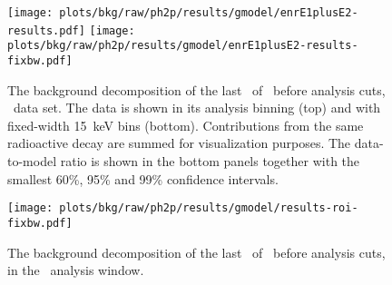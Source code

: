 \begin{figure}
  \centering
  \texttt{[image: plots/bkg/raw/ph2p/results/gmodel/enrE1plusE2-results.pdf]}
  \texttt{[image: plots/bkg/raw/ph2p/results/gmodel/enrE1plusE2-results-fixbw.pdf]}
  \caption{%
    The background decomposition of the last \gexpophasetwopbkg\ of \gerdatwo\ before
    analysis cuts, \enrGeIIp\ data set. The data is shown in its analysis binning (top)
    and with fixed-width 15~keV bins (bottom). Contributions from the same radioactive
    decay are summed for visualization purposes. The data-to-model ratio is shown in the
    bottom panels together with the smallest 60\%, 95\% and 99\% confidence intervals.
  }\label{fig:bkg:raw:ph2p:results-3}
\end{figure}

\begin{figure}
  \centering
  \texttt{[image: plots/bkg/raw/ph2p/results/gmodel/results-roi-fixbw.pdf]}
  \caption{%
    The background decomposition of the last \gexpophasetwopbkg\ of \gerdatwo\ before
    analysis cuts, in the \onbb\ analysis window.
  }\label{fig:bkg:raw:ph2p:results:roi}
\end{figure}

